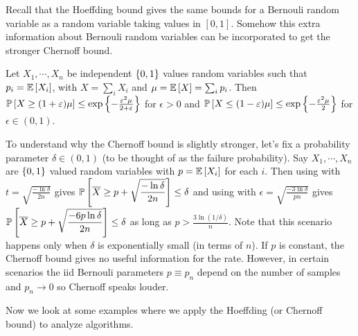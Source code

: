 Recall that the Hoeffding bound gives the same bounds for a Bernouli random variable as a random variable taking values in $[0,1]$. Somehow this extra information about Bernouli random variables can be incorporated to get the stronger Chernoff bound.

\begin{thm}\label{thm:chernoff}
Let $X_{1},\cdots,X_{n}$ be independent $\left\{0,1\right\}$ values random variables such that $p_{i} = \mathbb E\left[ X_{i} \right]$, with $X = \sum_{i}X_{i}$ and $\mu = \mathbb E\left[ X \right] = \sum_{i}p_{i}$. Then $\mathbb P\left[ X \ge (1+\varepsilon)\mu \right] \le \exp\left\{-\frac{\varepsilon^{2}\mu}{2+\varepsilon}\right\}$ for $\epsilon>0$ and $\mathbb P\left[ X\le(1-\varepsilon)\mu \right] \le \exp\left\{-\frac{\varepsilon^{2}\mu}{2}\right\}$ for $\epsilon\in (0,1)$.
\end{thm}

To understand why the Chernoff bound is slightly stronger, let's fix a probability parameter $\delta\in (0,1)$ (to be thought of as the failure probability). Say $X_{1},\cdots,X_{n}$ are $\left\{0,1\right\}$ valued random variables with $p=\mathbb E\left[ X_{i} \right]$ for each $i$. Then using  with $t=\sqrt{\frac{-\ln\delta}{2n}}$ gives $\displaystyle\mathbb P\left[ \overline X \ge p + \sqrt{\frac{-\ln\delta}{2n}} \right] \le \delta$ and using  with $\epsilon = \sqrt{\frac{-3\ln\delta}{pn}}$ gives $\displaystyle\mathbb P\left[ \overline X \ge p + \sqrt{\frac{-6p\ln\delta}{2n}} \right] \le \delta$ as long as $p>\frac{3\ln(1/\delta)}{n}$. Note that this scenario happens only when $\delta$ is exponentially small (in terms of $n$). If $p$ is constant, the Chernoff bound gives no useful information for the rate. However, in certain scenarios the iid Bernouli parameters $p\equiv p_{n}$ depend on the number of samples and $p_{n}\to 0$ so Chernoff speaks louder. %


Now we look at some examples where we apply the Hoeffding (or Chernoff bound) to analyze algorithms. 

